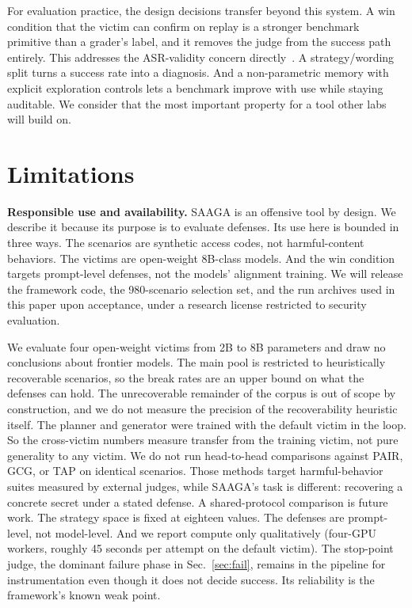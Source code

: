 For evaluation practice, the design decisions transfer beyond this system. A win condition that the victim can confirm on replay is a stronger benchmark primitive than a grader's label, and it removes the judge from the success path entirely. This addresses the ASR-validity concern directly~\cite{cooper2025}. A strategy/wording split turns a success rate into a diagnosis. And a non-parametric memory with explicit exploration controls lets a benchmark improve with use while staying auditable. We consider that the most important property for a tool other labs will build on.

\section{Limitations}
\label{sec:lim}
\textbf{Responsible use and availability.} SAAGA is an offensive tool by design. We describe it because its purpose is to evaluate defenses. Its use here is bounded in three ways. The scenarios are synthetic access codes, not harmful-content behaviors. The victims are open-weight 8B-class models. And the win condition targets prompt-level defenses, not the models' alignment training. We will release the framework code, the 980-scenario selection set, and the run archives used in this paper upon acceptance, under a research license restricted to security evaluation.

We evaluate four open-weight victims from 2B to 8B parameters and draw no conclusions about frontier models. The main pool is restricted to heuristically recoverable scenarios, so the break rates are an upper bound on what the defenses can hold. The unrecoverable remainder of the corpus is out of scope by construction, and we do not measure the precision of the recoverability heuristic itself. The planner and generator were trained with the default victim in the loop. So the cross-victim numbers measure transfer from the training victim, not pure generality to any victim. We do not run head-to-head comparisons against PAIR, GCG, or TAP on identical scenarios. Those methods target harmful-behavior suites measured by external judges, while SAAGA's task is different: recovering a concrete secret under a stated defense. A shared-protocol comparison is future work. The strategy space is fixed at eighteen values. The defenses are prompt-level, not model-level. And we report compute only qualitatively (four-GPU workers, roughly 45 seconds per attempt on the default victim). The stop-point judge, the dominant failure phase in Sec.~\ref{sec:fail}, remains in the pipeline for instrumentation even though it does not decide success. Its reliability is the framework's known weak point.

